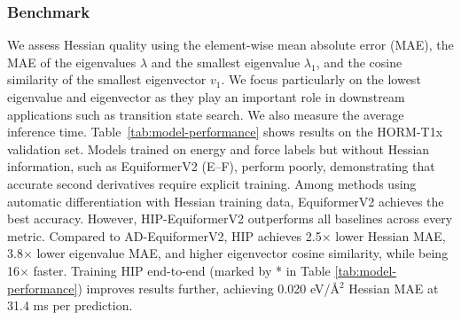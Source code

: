 \documentclass[pdflatex,sn-mathphys-num]{sn-jnl}%
\theoremstyle{thmstyleone}%
\theoremstyle{thmstyletwo}%
\theoremstyle{thmstylethree}%
\begin{document}
\subsubsection{Benchmark}
We assess Hessian quality using the element-wise mean absolute error (MAE), the MAE of the eigenvalues $\lambda$ and the smallest eigenvalue $\lambda_1$, and the cosine similarity of the smallest eigenvector $v_1$. We focus particularly on the lowest eigenvalue and eigenvector as they play an important role in downstream applications such as transition state search. We also measure the average inference time. Table~\ref{tab:model-performance} shows results on the HORM-T1x validation set.
Models trained on energy and force labels but without Hessian information, such as EquiformerV2 (E–F), perform poorly, demonstrating that accurate second derivatives require explicit training. Among methods using automatic differentiation with Hessian training data, EquiformerV2 achieves the best accuracy. However, HIP-EquiformerV2 outperforms all baselines across every metric. Compared to AD-EquiformerV2, HIP achieves 2.5$\times$ lower Hessian MAE, 3.8$\times$ lower eigenvalue MAE, and higher eigenvector cosine similarity, while being 16$\times$ faster. Training HIP end-to-end (marked by * in Table \ref{tab:model-performance}) improves results further, achieving 0.020 eV/\AA$^2$ Hessian MAE at 31.4 ms per prediction.
\end{document}
